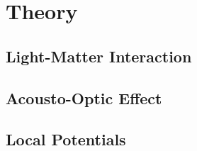 \chapter{Theory}

\section{Light-Matter Interaction}

\section{Acousto-Optic Effect}

\section{Local Potentials}
